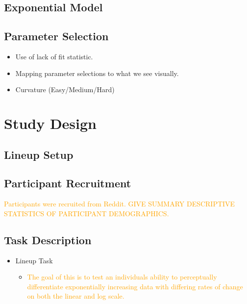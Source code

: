 \documentclass[]{interact}
\theoremstyle{plain}%
\theoremstyle{definition}
\theoremstyle{remark}
\def\tightlist{}
\begin{document}
\hypertarget{exponential-model}{%
\subsection{Exponential Model}\label{exponential-model}}

\textcolor{Orange}{}

\hypertarget{parameter-selection}{%
\subsection{Parameter Selection}\label{parameter-selection}}

\begin{itemize}
\tightlist
\item
  Use of lack of fit statistic.
\item
  Mapping parameter selections to what we see visually.
\item
  Curvature (Easy/Medium/Hard)
\end{itemize}

\hypertarget{study-design}{%
\section{Study Design}\label{study-design}}

\hypertarget{lineup-setup}{%
\subsection{Lineup Setup}\label{lineup-setup}}

\hypertarget{participant-recruitment}{%
\subsection{Participant Recruitment}\label{participant-recruitment}}

\textcolor{Orange}{Participants were recruited from Reddit. GIVE SUMMARY DESCRIPTIVE STATISTICS OF PARTICIPANT DEMOGRAPHICS.}

\hypertarget{task-description}{%
\subsection{Task Description}\label{task-description}}

\begin{itemize}
\item
  Lineup Task

  \begin{itemize}
  \item
    \textcolor{Orange}{The goal of this is to test an individuals ability to perceptually differentiate exponentially increasing data with differing rates of change on both the linear and log scale.}
  \end{itemize}
\end{itemize}
\end{document}
